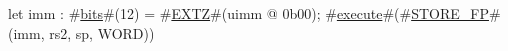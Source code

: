 let imm : #\hyperref[sailRISCVzbits]{bits}#(12) = #\hyperref[sailRISCVzEXTZ]{EXTZ}#(uimm @ 0b00);
#\hyperref[sailRISCVzexecute]{execute}#(#\hyperref[sailRISCVzSTOREzyFP]{STORE\_FP}#(imm, rs2, sp, WORD))
